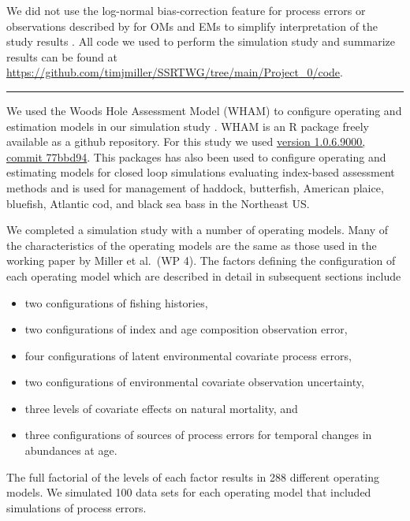 \documentclass[
  12pt,
]{article}
\begin{document}
We did not use the log-normal bias-correction feature for process errors or observations described by \citep{stockmiller21} for OMs and EMs to simplify interpretation of the study results \citep{lietalinreview}. All code we used to perform the simulation study and summarize results can be found at \url{https://github.com/timjmiller/SSRTWG/tree/main/Project_0/code}.

\begin{center}\rule{0.5\linewidth}{0.5pt}\end{center}

We used the Woods Hole Assessment Model (WHAM) to configure operating and estimation models in our simulation study \citep{millerstock20, stockmiller21}. WHAM is an R package freely available as a github repository. For this study we used \href{https://github.com/timjmiller/wham/tree/77bbd946e4881216a439933473d1c58b21c270c3}{version 1.0.6.9000, commit 77bbd94}. This packages has also been used to configure operating and estimating models for closed loop simulations evaluating index-based assessment methods \citep{legaultetal23} and is used for management of haddock, butterfish, American plaice, bluefish, Atlantic cod, and black sea bass in the Northeast US.

We completed a simulation study with a number of operating models. Many of the characteristics of the operating models are the same as those used in the working paper by Miller et al.~(WP 4). The factors defining the configuration of each operating model which are described in detail in subsequent sections include

\begin{itemize}
\item two configurations of fishing histories, 
\item two configurations of index and age composition observation error, 
\item four configurations of latent environmental covariate process errors, 
\item two configurations of environmental covariate observation uncertainty, 
\item three levels of covariate effects on natural mortality, and 
\item three configurations of sources of process errors for temporal changes in abundances at age. 
\end{itemize}

The full factorial of the levels of each factor results in 288 different operating models. We simulated 100 data sets for each operating model that included simulations of process errors.
\end{document}
